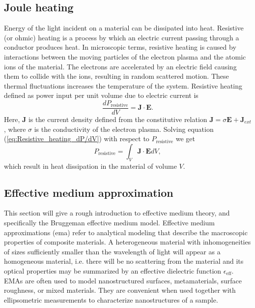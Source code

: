 

\subsection{Joule heating}
Energy of the light incident on a material can be dissipated into heat. Resistive (or ohmic) heating is a process by which an electric current passing through a conductor produces heat. In microscopic terms, resistive heating is caused by interactions between the moving particles of the electron plasma and the atomic ions of the material. The electrons are accelerated by an electric field causing them to collide with the ions, resulting in random scattered motion. These thermal fluctuations increases the temperature of the system. Resistive heating defined as power input per unit volume due to electric current is \cite{jackson}
\begin{equation}
    \frac{dP_{\text{resistive}}}{dV} = \mathbf{J}\cdot\mathbf{E}.
    \label{eq:Resistive_heating_dP/dV}
\end{equation}
Here, $\mathbf{J}$ is the current density defined from the constitutive relation $\mathbf{J}=\sigma\mathbf{E}+\mathbf{J}_{ext}$, where $\sigma$ is the conductivity of the electron plasma.  Solving equation (\ref{eq:Resistive_heating_dP/dV}) with respect to $P_{\text{resistive}}$ we get
\begin{equation}
    P_{\text{resistive}} = \int_V \mathbf{J}\cdot\mathbf{E} dV,
    \label{eq:Resistive_heating_P}
\end{equation}
which result in heat dissipation in the material of volume $V$.

\subsection{Effective medium approximation}
This section will give a rough introduction to effective medium theory, and specifically the Bruggeman effective medium model. Effective medium approximations (\ac{ema}) refer to analytical modeling that describe the macroscopic properties of composite materials. A heterogeneous material with inhomogeneities of sizes sufficiently smaller than the wavelength of light will appear as a homogeneous material, i.e. there will be no scattering from the material and its optical properties may be summarized by an effective dielectric function $\epsilon_\text{eff}$\cite{hans_arwin}. EMAs are often used to model nanostructured surfaces, metamaterials, surface roughness, or mixed materials. They are convenient when used together with ellipsometric measurements to characterize nanostructures of a sample.

